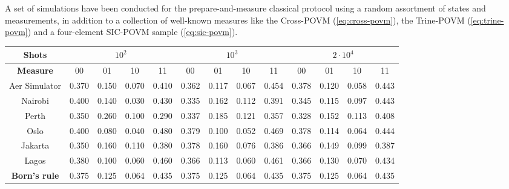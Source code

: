 A set of simulations have been conducted for the prepare-and-measure classical protocol using a random assortment of states and measurements, in addition to a collection of well-known measures like the Cross-POVM (\ref{eq:cross-povm}), the Trine-POVM (\ref{eq:trine-povm}) and a four-element SIC-POVM sample (\ref{eq:sic-povm}). 

\begin{landscape}
\vspace*{\fill}
\begin{tabular}{c|cccc|cccc|cccc}
\toprule
\textbf{Shots}  & \multicolumn{4}{c|}{$10^2$} 
                & \multicolumn{4}{c|}{$10^3$} 
                & \multicolumn{4}{c}{$2\cdot 10^4$}\\
\midrule
\textbf{Measure}  & 00 & 01 & 10 & 11
    & 00 & 01 & 10 & 11
    & 00 & 01 & 10 & 11\\
\midrule
Aer Simulator   & 0.370 & 0.150 & 0.070 & 0.410 
                & 0.362 & 0.117 & 0.067 & 0.454 
                & 0.378 & 0.120 & 0.058 & 0.443\\                
Nairobi         & 0.400 & 0.140 & 0.030 & 0.430 
                & 0.335 & 0.162 & 0.112 & 0.391 
                & 0.345 & 0.115 & 0.097 & 0.443\\               
Perth           & 0.350 & 0.260 & 0.100 & 0.290 
                & 0.337 & 0.185 & 0.121 & 0.357 
                & 0.328 & 0.152 & 0.113 & 0.408\\
Oslo            & 0.400 & 0.080 & 0.040 & 0.480 
                & 0.379 & 0.100 & 0.052 & 0.469 
                & 0.378 & 0.114 & 0.064 & 0.444\\
Jakarta         & 0.350 & 0.160 & 0.110 & 0.380 
                & 0.378 & 0.160 & 0.076 & 0.386 
                & 0.366 & 0.149 & 0.099 & 0.387\\   
Lagos           & 0.380 & 0.100 & 0.060 & 0.460 
                & 0.366 & 0.113 & 0.060 & 0.461 
                & 0.366 & 0.130 & 0.070 & 0.434\\
\midrule
\textbf{Born's rule}     & 0.375 & 0.125 & 0.064 & 0.435 
                & 0.375 & 0.125 & 0.064 & 0.435
                & 0.375 & 0.125 & 0.064 & 0.435\\
\bottomrule        
\end{tabular}
\label{table:quantum_results}
\vspace*{\fill}
\end{landscape}

